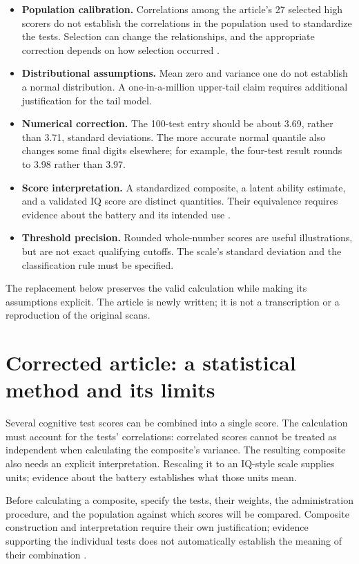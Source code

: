 \documentclass[
  a4paper,fontsize=11pt,parskip=half,headings=small,
  numbers=noenddot,bibliography=totoc
]{scrartcl}
\begin{document}
\begin{itemize}
  \item \textbf{Population calibration.} Correlations among the article's
  27 selected high scorers do not establish the correlations in the population
  used to standardize the tests. Selection can change the relationships, and
  the appropriate correction depends on how selection occurred
  \citep{sackett2000}.
  \item \textbf{Distributional assumptions.} Mean zero and variance one do
  not establish a normal distribution. A one-in-a-million upper-tail claim
  requires additional justification for the tail model.
  \item \textbf{Numerical correction.} The 100-test entry should be about
  3.69, rather than 3.71, standard deviations. The more accurate normal
  quantile also changes some final digits elsewhere; for example, the
  four-test result rounds to 3.98 rather than 3.97.
  \item \textbf{Score interpretation.} A standardized composite, a latent
  ability estimate, and a validated IQ score are distinct quantities.
  Their equivalence requires evidence about the battery and its intended use
  \citep[Standard~1.14]{standards2014}.
  \item \textbf{Threshold precision.} Rounded whole-number scores are useful
  illustrations, but are not exact qualifying cutoffs. The scale's standard
  deviation and the classification rule must be specified.
\end{itemize}

The replacement below preserves the valid calculation while making its
assumptions explicit. The article is newly written; it is not a transcription
or a reproduction of the original scans.

\section{Corrected article: a statistical method and its limits}
\label{sec:replacement}

Several cognitive test scores can be combined into a single score. The
calculation must account for the tests' correlations: correlated scores
cannot be treated as independent when calculating the composite's variance.
The resulting composite also needs an explicit interpretation. Rescaling it
to an IQ-style scale supplies units; evidence about the battery establishes
what those units mean.

Before calculating a composite, specify the tests, their weights, the
administration procedure, and the population against which scores will be
compared. Composite construction and interpretation require their own
justification; evidence supporting the individual tests does not
automatically establish the meaning of their combination
\citep[Standard~1.14]{standards2014}.
\end{document}
